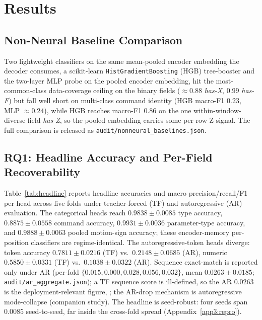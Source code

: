 \documentclass[sensors,article,submit,moreauthors,pdftex]{Definitions/mdpi}
\begin{document}
\section{Results}
\label{sec:experiments}

\subsection{Non-Neural Baseline Comparison}
\label{sec:results-baseline}

Two lightweight classifiers on the same mean-pooled encoder embedding the decoder consumes, a scikit-learn \texttt{HistGradientBoosting} (HGB) tree-booster and the two-layer MLP probe on the pooled encoder embedding, hit the most-common-class data-coverage ceiling on the binary fields ($\approx\!0.88$ \emph{has-X}, $0.99$ \emph{has-F}) but fall well short on multi-class command identity (HGB macro-F1 $0.23$, MLP $\approx\!0.24$), while HGB reaches macro-F1 $0.86$ on the one within-window-diverse field \emph{has-Z}, so the pooled embedding carries some per-row Z signal. The full comparison is released as \texttt{audit/nonneural\_baselines.json}.

\subsection{RQ1: Headline Accuracy and Per-Field Recoverability}
\label{sec:results-headline}

Table~\ref{tab:headline} reports headline accuracies and macro precision/recall/F1 per head across five folds under teacher-forced (TF) and autoregressive (AR) evaluation. The categorical heads reach $0.9838 \pm 0.0085$ type accuracy, $0.8875 \pm 0.0558$ command accuracy, $0.9931 \pm 0.0036$ parameter-type accuracy, and $0.9888 \pm 0.0063$ pooled motion-sign accuracy; these encoder-memory per-position classifiers are regime-identical. The autoregressive-token heads diverge: token accuracy $0.7811 \pm 0.0216$ (TF) vs.\ $0.2148 \pm 0.0685$ (AR), numeric $0.5850 \pm 0.0331$ (TF) vs.\ $0.1038 \pm 0.0322$ (AR). Sequence exact-match is reported only under AR (per-fold $\{0.015, 0.000, 0.028, 0.056, 0.032\}$, mean $0.0263 \pm 0.0185$; \texttt{audit/ar\_aggregate.json}); a TF sequence score is ill-defined, so the AR $0.0263$ is the deployment-relevant figure, ; the AR-drop mechanism is autoregressive mode-collapse (companion study). The headline is seed-robust: four seeds span $0.0085$ seed-to-seed, far inside the cross-fold spread (Appendix~\ref{app3:repro}).
\end{document}
